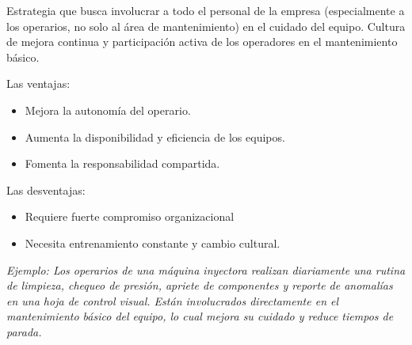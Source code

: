 \documentclass[a4paper,oneside,11pt]{article}
\begin{document}
\begin{enumerate}
\begin{itemize}
        Estrategia que busca involucrar a todo el personal de la empresa (especialmente a los operarios, no solo al área de mantenimiento) en el cuidado del equipo. Cultura de mejora continua y participación activa de los operadores en el mantenimiento básico.
        
        Las ventajas:
        \begin{itemize}
            \item Mejora la autonomía del operario.
            \item Aumenta la disponibilidad y eficiencia de los equipos.
            \item Fomenta la responsabilidad compartida.
        \end{itemize}
        Las desventajas:
        \begin{itemize}
            \item Requiere fuerte compromiso organizacional
            \item Necesita entrenamiento constante y cambio cultural.
        \end{itemize}

        \textit{Ejemplo: Los operarios de una máquina inyectora realizan diariamente una rutina de limpieza, chequeo de presión, apriete de componentes y reporte de anomalías en una hoja de control visual. Están involucrados directamente en el mantenimiento básico del equipo, lo cual mejora su cuidado y reduce tiempos de parada.}




\end{itemize}
\end{enumerate}
\end{document}
